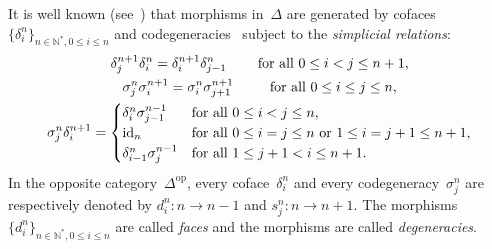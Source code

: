 \documentclass[10pt,a4paper]{amsart}
\numberwithin{equation}{section}
\newcommand{\co}{\colon}
\newcommand{\id}{\mathrm{id}}
\newcommand{\opp}{\mathrm{op}}
\newcommand{\N}{\mathbb{N}}
\begin{document}
It is well known (see~\cite[Lemma 5.1]{MCLHomology}) that morphisms in~$\Delta$ are generated by cofaces $\{\delta_i^n\}_{n\in \N^*, 0\leq i \leq n}$ and codegeneracies~\smash{$\bigl\{\sigma_j^n\bigr\}_{n\in \N, 0\leq j \leq n}$} subject to the \textit{simplicial relations}:
\begingroup
\allowdisplaybreaks
\begin{gather}
\label{cofaces} \delta_j^{n+1} \delta_i^n= \delta_i^{n+1} \delta_{j-1}^n \hspace{7.9mm} \text{for all }0 \le i<j \le n+1, \\
\label{codegeneracies} \sigma_j^{n}\sigma_i^{n+1}=\sigma_i^n\sigma_{j+1}^{n+1} \hspace{9.2mm} \text{for all } 0\le i \leq j \le n,
\\
\label{compcofcod}\sigma_j^n\delta_i^{n+1}= \begin{cases}
\delta_i^n \sigma_{j-1}^{n-1} & \text{for all } 0\le i<j \le n, \\
\id_{n} & \text{for all } 0 \le i=j \le n \text{ or } 1\le i=j+1 \le n+1,\\
\delta_{i-1}^n\sigma_j^{n-1} & \text{for all } 1\le j+1 < i \le n+1.
\end{cases}
\end{gather}
\endgroup
In the op\-po\-site ca\-te\-go\-ry~$\Delta^{\opp}$, every co\-face~$\delta_i^n$ and every co\-de\-ge\-ne\-ra\-cy~$\sigma_j^n$ are re\-spec\-tively de\-noted by
$
d_i^n \co n \to n-1$ and $s_j^n \co n \to n+1$.
The morphisms $\{d_i^n\}_{n\in \N^*, 0\le i \le n}$ are called \textit{faces} and the morphisms \smash{$\bigl\{s_j^n\bigr\}_{n\in \N, 0 \le j \le n}$} are called \textit{degeneracies}.
\end{document}
